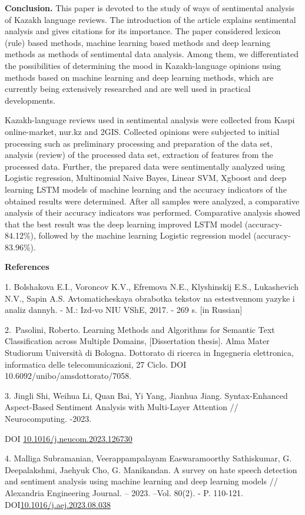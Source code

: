 {\bfseries Conclusion.} This paper is devoted to the study of ways of
sentimental analysis of Kazakh language reviews. The introduction of the
article explains sentimental analysis and gives citations for its
importance. The paper considered lexicon (rule) based methods, machine
learning based methods and deep learning methods as methods of
sentimental data analysis. Among them, we differentiated the
possibilities of determining the mood in Kazakh-language opinions using
methods based on machine learning and deep learning methods, which are
currently being extensively researched and are well used in practical
developments.

Kazakh-language reviews used in sentimental analysis were collected from
Kaspi online-market, nur.kz and 2GIS. Collected opinions were subjected
to initial processing such as preliminary processing and preparation of
the data set, analysis (review) of the processed data set, extraction of
features from the processed data. Further, the prepared data were
sentimentally analyzed using Logistic regression, Multinomial Naive
Bayes, Linear SVM, Xgboost and deep learning LSTM models of machine
learning and the accuracy indicators of the obtained results were
determined. After all samples were analyzed, a comparative analysis of
their accuracy indicators was performed. Comparative analysis showed
that the best result was the deep learning improved LSTM model
(accuracy-84.12\%), followed by the machine learning Logistic regression
model (accuracy-83.96\%).

{\bfseries References}

1. Bolshakova E.I., Voroncov K.V., Efremova N.E., Klyshinskij E.S.,
Lukashevich N.V., Sapin A.S. Avtomaticheskaya obrabotka tekstov na
estestvennom yazyke i analiz dannyh. - M.: Izd-vo NIU VShE, 2017. - 269
s. {[}in Russian{]}

2.~Pasolini, Roberto. Learning Methods and Algorithms for Semantic Text
Classification across Multiple Domains, {[}Dissertation thesis{]}. Alma
Mater Studiorum Università di Bologna. Dottorato di ricerca in
Ingegneria elettronica, informatica delle telecomunicazioni, 27 Ciclo.
DOI 10.6092/unibo/amsdottorato/7058.

3. Jingli Shi, Weihua Li, Quan Bai, Yi Yang, Jianhua Jiang.
Syntax-Enhanced Aspect-Based Sentiment Analysis with Multi-Layer
Attention // Neurocomputing. -2023.

DOI
\href{https://doi.org/10.1016/j.neucom.2023.126730}{10.1016/j.neucom.2023.126730}

4. Malliga Subramanian, Veerappampalayam Easwaramoorthy Sathiskumar, G.
Deepalakshmi, Jaehyuk Cho, G. Manikandan. A survey on hate speech
detection and sentiment analysis using machine learning and deep
learning models // Alexandria Engineering Journal. -- 2023. --Vol.
80(2). - P. 110-121.
DOI\href{http://dx.doi.org/10.1016/j.aej.2023.08.038}{10.1016/j.aej.2023.08.038}

